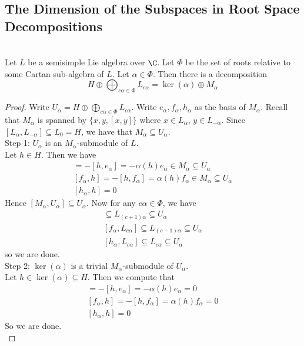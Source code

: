 \documentclass[a4paper]{article}
\begin{document}
\subsection{The Dimension of the Subspaces in Root Space Decompositions}
\begin{lmm}{}{} \\Let $L$ be a semisimple Lie algebra over $\C$. Let $\Phi$ be the set of roots relative to some Cartan sub-algebra of $L$. Let $\alpha\in\Phi$. Then there is a decomposition $$H\oplus\bigoplus_{c\alpha\in\Phi}L_{c\alpha}=\ker(\alpha)\oplus M_\alpha$$ 
\begin{proof}
Write $U_\alpha=H\oplus\bigoplus_{c\alpha\in\Phi}L_{c\alpha}$. Write $e_\alpha,f_\alpha,h_\alpha$ as the basis of $M_\alpha$. Recall that $M_\alpha$ is spanned by $\{x,y,[x,y]\}$ where $x\in L_\alpha$, $y\in L_{-\alpha}$. Since $[L_\alpha,L_{-\alpha}]\subseteq L_0=H$, we have that $M_\alpha\subseteq U_\alpha$. \\

Step 1: $U_\alpha$ is an $M_\alpha$-submodule of $L$. \\
Let $h\in H$. Then we have 
\begin{align*}
[e_\alpha,h]=-[h,e_\alpha]=-\alpha(h)e_\alpha\in M_\alpha\subseteq U_\alpha\\
[f_\alpha,h]=-[h,f_\alpha]=\alpha(h)f_\alpha\in M_\alpha\subseteq U_\alpha\\
[h_\alpha,h]=0\tag{Since $H=C_L(H)$}
\end{align*}
Hence $[M_\alpha,U_\alpha]\subseteq U_\alpha$. Now for any $c\alpha\in\Phi$, we have 
\begin{align*}
[e_\alpha,L_{c\alpha}]\subseteq L_{(c+1)\alpha}\subseteq U_\alpha\\
[f_\alpha,L_{c\alpha}]\subseteq L_{(c-1)\alpha}\subseteq U_\alpha\\
[h_\alpha,L_{c\alpha}]\subseteq L_{c\alpha}\subseteq U_\alpha
\end{align*}
so we are done. \\

Step 2: $\ker(\alpha)$ is a trivial $M_\alpha$-submodule of $U_\alpha$. \\
Let $h\in\ker(\alpha)\subseteq H$. Then we compute that 
\begin{align*}
[e_\alpha,h]=-[h,e_\alpha]=-\alpha(h)e_\alpha=0\\
[f_\alpha,h]=-[h,f_\alpha]=\alpha(h)f_\alpha=0\\
[h_\alpha,h]=0\tag{Since $H=C_L(H)$}
\end{align*}
So we are done. \\


\end{proof}
\end{lmm}
\end{document}
